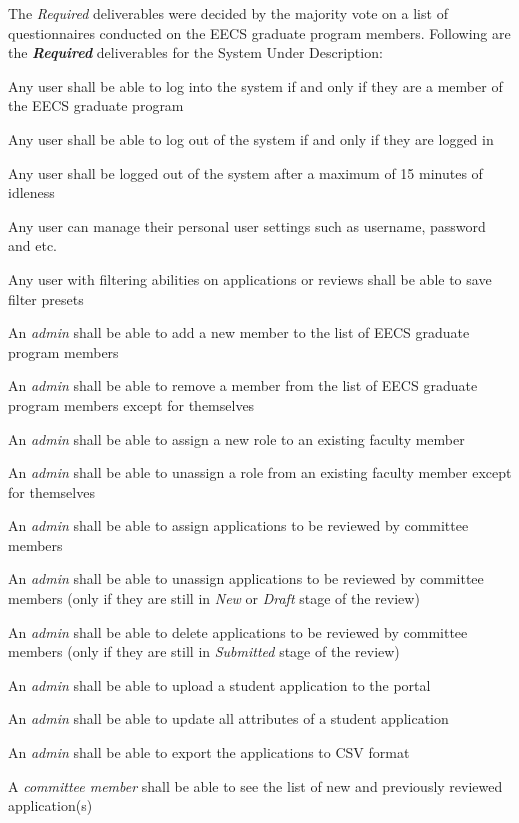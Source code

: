 \documentclass[fontsize=12pt,paper=letter,twoside]{scrartcl}
\begin{document}
The \emph{Required} deliverables were decided by the majority vote on a list of questionnaires conducted on the EECS graduate program members. Following are the \textbf{\emph{Required}} deliverables for the System Under Description:\\

\begin{mylist}
\item Any user shall be able to log into the system if and only if they are a member of the EECS graduate program
\item Any user shall be able to log out of the system if and only if they are logged in
\item Any user shall be logged out of the system after a maximum of 15 minutes of idleness
\item Any user can manage their personal user settings such as username, password and etc.
\item Any user with filtering abilities on applications or reviews shall be able to save filter presets
\item An \emph{admin} shall be able to add a new member to the list of EECS graduate program members
\item An \emph{admin} shall be able to remove a member from the list of EECS graduate program members except for themselves
\item An \emph{admin} shall be able to assign a new role to an existing faculty member
\item An \emph{admin} shall be able to unassign a role from an existing faculty member except for themselves
\item An \emph{admin} shall be able to assign applications to be reviewed by committee members
\item An \emph{admin} shall be able to unassign applications to be reviewed by committee members (only if they are still in \emph{New} or \emph{Draft} stage of the review)
\item An \emph{admin} shall be able to delete applications to be reviewed by committee members (only if they are still in \emph{Submitted} stage of the review)
\item An \emph{admin} shall be able to upload a student application to the portal
\item An \emph{admin} shall be able to update all attributes of a student application
\item An \emph{admin} shall be able to export the applications to CSV format
\item A \emph{committee member} shall be able to see the list of new and previously reviewed application(s)

\end{mylist}
\end{document}
